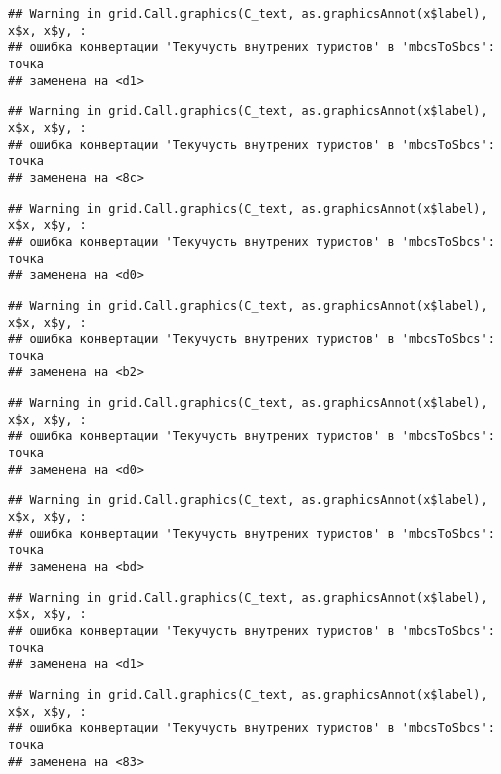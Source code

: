\documentclass[
]{article}
\begin{document}
\begin{verbatim}
## Warning in grid.Call.graphics(C_text, as.graphicsAnnot(x$label), x$x, x$y, :
## ошибка конвертации 'Текучусть внутрених туристов' в 'mbcsToSbcs': точка
## заменена на <d1>
\end{verbatim}

\begin{verbatim}
## Warning in grid.Call.graphics(C_text, as.graphicsAnnot(x$label), x$x, x$y, :
## ошибка конвертации 'Текучусть внутрених туристов' в 'mbcsToSbcs': точка
## заменена на <8c>
\end{verbatim}

\begin{verbatim}
## Warning in grid.Call.graphics(C_text, as.graphicsAnnot(x$label), x$x, x$y, :
## ошибка конвертации 'Текучусть внутрених туристов' в 'mbcsToSbcs': точка
## заменена на <d0>
\end{verbatim}

\begin{verbatim}
## Warning in grid.Call.graphics(C_text, as.graphicsAnnot(x$label), x$x, x$y, :
## ошибка конвертации 'Текучусть внутрених туристов' в 'mbcsToSbcs': точка
## заменена на <b2>
\end{verbatim}

\begin{verbatim}
## Warning in grid.Call.graphics(C_text, as.graphicsAnnot(x$label), x$x, x$y, :
## ошибка конвертации 'Текучусть внутрених туристов' в 'mbcsToSbcs': точка
## заменена на <d0>
\end{verbatim}

\begin{verbatim}
## Warning in grid.Call.graphics(C_text, as.graphicsAnnot(x$label), x$x, x$y, :
## ошибка конвертации 'Текучусть внутрених туристов' в 'mbcsToSbcs': точка
## заменена на <bd>
\end{verbatim}

\begin{verbatim}
## Warning in grid.Call.graphics(C_text, as.graphicsAnnot(x$label), x$x, x$y, :
## ошибка конвертации 'Текучусть внутрених туристов' в 'mbcsToSbcs': точка
## заменена на <d1>
\end{verbatim}

\begin{verbatim}
## Warning in grid.Call.graphics(C_text, as.graphicsAnnot(x$label), x$x, x$y, :
## ошибка конвертации 'Текучусть внутрених туристов' в 'mbcsToSbcs': точка
## заменена на <83>
\end{verbatim}
\end{document}
